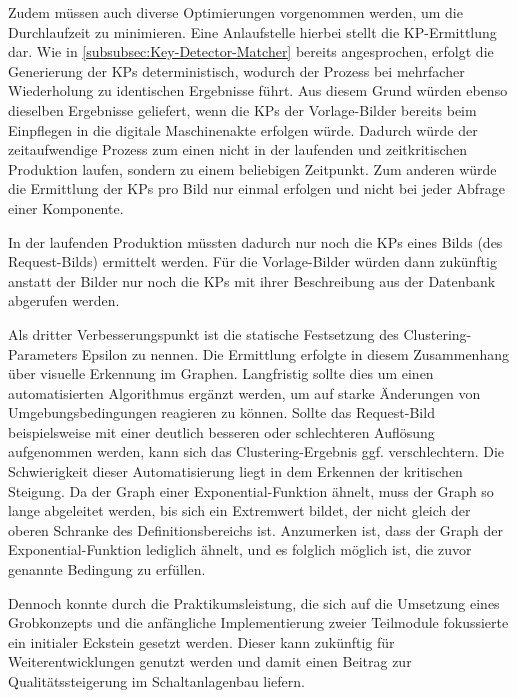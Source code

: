 \documentclass[
    type=Prakikumsbericht,
    status=draft, %
    language=german, %
    bibengine=bibtex,
]{unibwm-inf-thesis}
\begin{document}
    Zudem müssen auch diverse Optimierungen vorgenommen werden, um die Durchlaufzeit zu minimieren.
    Eine Anlaufstelle hierbei stellt die \ac{KP}-Ermittlung dar.
    Wie in \autoref{subsubsec:Key-Detector-Matcher} bereits angesprochen, erfolgt die Generierung der \acp{KP} deterministisch, wodurch der Prozess bei mehrfacher Wiederholung zu identischen Ergebnisse führt.
    Aus diesem Grund würden ebenso dieselben Ergebnisse geliefert, wenn die \acp{KP} der Vorlage-Bilder bereits beim Einpflegen in die digitale Maschinenakte erfolgen würde.
    Dadurch würde der zeitaufwendige Prozess zum einen nicht in der laufenden und zeitkritischen Produktion laufen, sondern zu einem beliebigen Zeitpunkt.
    Zum anderen würde die Ermittlung der \acp{KP} pro Bild nur einmal erfolgen und nicht bei jeder Abfrage einer Komponente.

    In der laufenden Produktion müssten dadurch nur noch die \acp{KP} eines Bilds (des Request-Bilds) ermittelt werden.
    Für die Vorlage-Bilder würden dann zukünftig anstatt der Bilder nur noch die \acp{KP} mit ihrer Beschreibung aus der Datenbank abgerufen werden.

    Als dritter Verbesserungspunkt ist die statische Festsetzung des Clustering-Parameters Epsilon zu nennen.
    Die Ermittlung erfolgte in diesem Zusammenhang über visuelle Erkennung im Graphen.
    Langfristig sollte dies um einen automatisierten Algorithmus ergänzt werden, um auf starke Änderungen von Umgebungsbedingungen reagieren zu können.
    Sollte das Request-Bild beispielsweise mit einer deutlich besseren oder schlechteren Auflösung aufgenommen werden, kann sich das Clustering-Ergebnis ggf. verschlechtern.
    Die Schwierigkeit dieser Automatisierung liegt in dem Erkennen der kritischen Steigung.
    Da der Graph einer Exponential-Funktion ähnelt, muss der Graph so lange abgeleitet werden, bis sich ein Extremwert bildet, der nicht gleich der oberen Schranke des Definitionsbereichs ist.
    Anzumerken ist, dass der Graph der Exponential-Funktion lediglich ähnelt, und es folglich möglich ist, die zuvor genannte Bedingung zu erfüllen.

    Dennoch konnte durch die Praktikumsleistung, die sich auf die Umsetzung eines Grobkonzepts und die anfängliche Implementierung zweier Teilmodule fokussierte ein initialer Eckstein gesetzt werden.
    Dieser kann zukünftig für Weiterentwicklungen genutzt werden und damit einen Beitrag zur Qualitätssteigerung im Schaltanlagenbau liefern.

    
    \listoffigures
    \listoftables
    \backmatter
\end{document}
